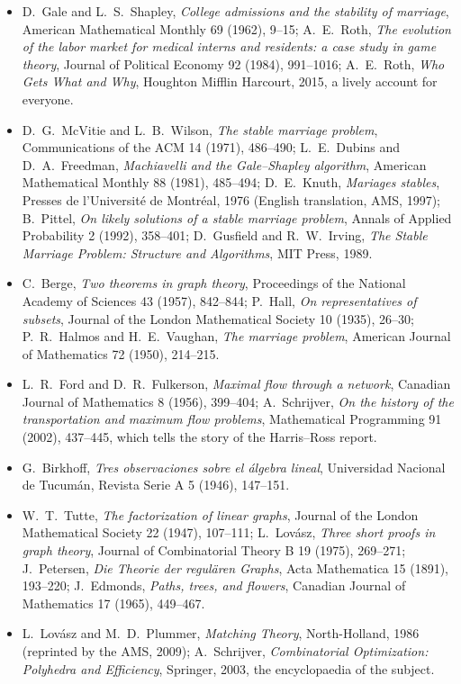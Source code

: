 \begin{itemize}
\item D.~Gale and L.~S.~Shapley, \emph{College admissions and the stability of marriage}, American Mathematical Monthly 69 (1962),
9--15; A.~E.~Roth, \emph{The evolution of the labor market for medical interns and residents: a case study in game theory},
Journal of Political Economy 92 (1984), 991--1016; A.~E.~Roth, \emph{Who Gets What and Why}, Houghton Mifflin Harcourt, 2015, a
lively account for everyone.
\item D.~G.~McVitie and L.~B.~Wilson, \emph{The stable marriage problem}, Communications of the ACM 14 (1971), 486--490; L.~E.~Dubins and
D.~A.~Freedman, \emph{Machiavelli and the Gale--Shapley algorithm}, American Mathematical Monthly 88 (1981), 485--494; D.~E.~Knuth,
\emph{Mariages stables}, Presses de l'Universit\'e de Montr\'eal, 1976 (English translation, AMS, 1997); B.~Pittel, \emph{On likely solutions
of a stable marriage problem}, Annals of Applied Probability 2 (1992), 358--401; D.~Gusfield and R.~W.~Irving, \emph{The Stable Marriage
Problem: Structure and Algorithms}, MIT Press, 1989.
\item C.~Berge, \emph{Two theorems in graph theory}, Proceedings of the National Academy of Sciences 43 (1957), 842--844; P.~Hall,
\emph{On representatives of subsets}, Journal of the London Mathematical Society 10 (1935), 26--30; P.~R.~Halmos and H.~E.~Vaughan,
\emph{The marriage problem}, American Journal of Mathematics 72 (1950), 214--215.
\item L.~R.~Ford and D.~R.~Fulkerson, \emph{Maximal flow through a network}, Canadian Journal of Mathematics 8 (1956), 399--404;
A.~Schrijver, \emph{On the history of the transportation and maximum flow problems}, Mathematical Programming 91 (2002), 437--445,
which tells the story of the Harris--Ross report.
\item G.~Birkhoff, \emph{Tres observaciones sobre el \'algebra lineal}, Universidad Nacional de Tucum\'an, Revista Serie A 5 (1946), 147--151.
\item W.~T.~Tutte, \emph{The factorization of linear graphs}, Journal of the London Mathematical Society 22 (1947), 107--111; L.~Lov\'asz,
\emph{Three short proofs in graph theory}, Journal of Combinatorial Theory B 19 (1975), 269--271; J.~Petersen, \emph{Die Theorie der
regul\"aren Graphs}, Acta Mathematica 15 (1891), 193--220; J.~Edmonds, \emph{Paths, trees, and flowers}, Canadian Journal of Mathematics
17 (1965), 449--467.
\item L.~Lov\'asz and M.~D.~Plummer, \emph{Matching Theory}, North-Holland, 1986 (reprinted by the AMS, 2009); A.~Schrijver,
\emph{Combinatorial Optimization: Polyhedra and Efficiency}, Springer, 2003, the encyclopaedia of the subject.
\end{itemize}
